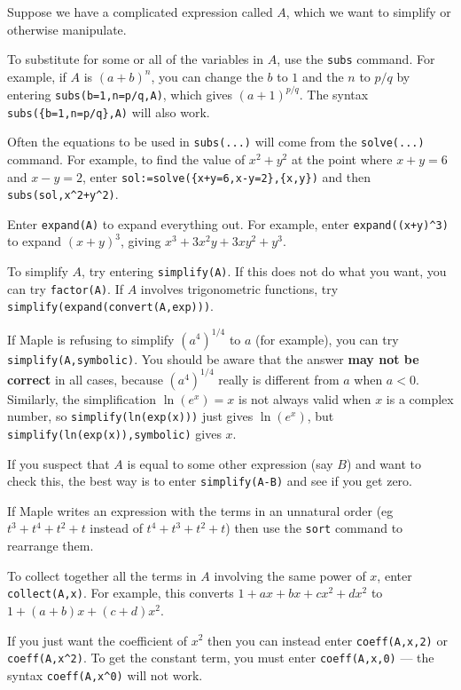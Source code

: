 \documentclass{amsart}
\begin{document}
Suppose we have a complicated expression called $A$, which we want to
simplify or otherwise manipulate. 
\begin{secenum}
 \item\label{subs} To substitute for some or all of the variables in
  $A$, use the \verb~subs~ command.  For example, if $A$ is
  $(a+b)^n$, you can change the $b$ to $1$ and the $n$ to
  $p/q$ by entering \verb~subs(b=1,n=p/q,A)~, which gives
  $(a+1)^{p/q}$.  The syntax \verb~subs({b=1,n=p/q},A)~
  will also work. 
%
 \item\label{solvesubs}
  Often the equations to be used in \verb~subs(...)~ will
  come from the \verb~solve(...)~ command.  For example, to
  find the value of $x^2+y^2$ at the point where $x+y=6$ and
  $x-y=2$, enter \verb~sol:=solve({x+y=6,x-y=2},{x,y})~ and
  then \verb~subs(sol,x^2+y^2)~. 
%
 \item\label{expand} Enter \verb~expand(A)~ to expand everything out.  For
  example, enter \verb~expand((x+y)^3)~ to expand
  $(x+y)^3$, giving $x^3+3x^2y+3xy^2+y^3$. 
%
 \item\label{simplify} To simplify $A$, try entering
  \verb~simplify(A)~.  If this 
  does not do what you want, you can try \verb~factor(A)~. 
  If $A$ involves trigonometric functions, try
  \verb~simplify(expand(convert(A,exp)))~. 
%
 \item\label{symbolic} If Maple is refusing to simplify $(a^4)^{1/4}$ to $a$ (for
  example), you can try \verb~simplify(A,symbolic)~.  You should be
  aware that the answer \textbf{may not be correct} in all cases,
  because $(a^4)^{1/4}$ really is different from $a$ when
  $a<0$.  Similarly, the simplification $\ln(e^x)=x$ is not
  always valid when $x$ is a complex number, so
  \verb~simplify(ln(exp(x)))~ just gives $\ln(e^x)$, but
  \verb~simplify(ln(exp(x)),symbolic)~ gives $x$. 
%
 \item\label{testequal} If you suspect that $A$ is equal to some other expression (say
  $B$) and want to check this, the best way is to enter
  \verb~simplify(A-B)~ and see if you get zero. 
%
 \item\label{sort} If Maple writes an expression with the terms in an unnatural
  order (eg $t^3+t^4+t^2+t$ instead of $t^4+t^3+t^2+t$) then use the
  \verb~sort~ command to rearrange them. 
%
 \item\label{collect} To collect together all the terms in $A$ involving the same
  power of $x$, enter \verb~collect(A,x)~.  For example, this converts
  $1+ax+bx+cx^2+dx^2$ to $1+(a+b)x+(c+d)x^2$. 
%
 \item\label{coeff}
  If you just want the
  coefficient of $x^2$ then you can instead enter \verb~coeff(A,x,2)~
  or \verb~coeff(A,x^2)~.  To get the constant term, you
  must enter \verb~coeff(A,x,0)~ --- the syntax
  \verb~coeff(A,x^0)~ will not work. 
\end{secenum}
\end{document}
